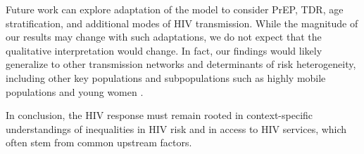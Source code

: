 Future work can explore adaptation of the model to consider
PrEP, TDR, age stratification, and additional modes of HIV transmission.
While the magnitude of our results may change with such adaptations,
we do not expect that the qualitative interpretation would change.
In fact, our findings would likely generalize
to other transmission networks and determinants of risk heterogeneity,
including other key populations and subpopulations such as
highly mobile populations and young women \cite{Camlin2019,Cheuk2020}.
\par
In conclusion, the HIV response must remain rooted in
context-specific understandings of inequalities in HIV risk and in access to HIV services,
which often stem from common upstream factors.
